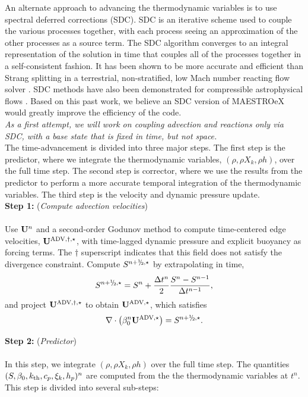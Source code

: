 \documentclass{aastex63}
\newcommand{\sfrac}[2]{\mathchoice
  {\kern0em\raise.5ex\hbox{\the\scriptfont0 #1}\kern-.15em/
   \kern-.15em\lower.25ex\hbox{\the\scriptfont0 #2}}
  {\kern0em\raise.5ex\hbox{\the\scriptfont0 #1}\kern-.15em/
   \kern-.15em\lower.25ex\hbox{\the\scriptfont0 #2}}
  {\kern0em\raise.5ex\hbox{\the\scriptscriptfont0 #1}\kern-.2em/
   \kern-.15em\lower.25ex\hbox{\the\scriptscriptfont0 #2}}
  {#1\!/#2}}
\newcommand{\myhalf}{\sfrac{1}{2}}
\newcommand{\Ub}{{\bf{U}}}
\newcommand{\uadvone}{\Ub^{\mathrm{ADV},\star}}
\newcommand{\uadvonedag}{\Ub^{\mathrm{ADV},\dagger,\star}}
\begin{document}
An alternate approach to advancing the thermodynamic variables is to use
spectral deferred corrections (SDC). SDC is an iterative scheme used to couple the various processes
together, with each process seeing an  approximation of the other processes as a source term.
The SDC algorithm converges to an integral representation of the solution in
time that couples all of the processes together in a self-consistent fashion.
It has been shown to be more accurate and efficient than Strang splitting in a
terrestrial, non-stratified, low Mach number reacting flow solver \cite{nonaka2012sdc}.
SDC methods have also been demonstrated for compressible astrophysical flows \cite{castro_sdc}.
Based on this past work, we believe an SDC version of MAESTROeX would greatly improve the efficiency of the code.
\\

\emph{As a first attempt, we will work on coupling advection and reactions only
via SDC, with a base state that is fixed in time, but not space.}
\\

The time-advancement is divided into three major steps.  The first step is the predictor, where we integrate the thermodynamic variables, $(\rho,\rho X_k,\rho h)$, over the full time step.  The second step is corrector, where we use the results from the predictor to perform a more accurate temporal integration of the thermodynamic variables.  The third step is the velocity and dynamic pressure update.\\

{\bf Step 1:} ({\it Compute advection velocities})\\ \\
Use $\Ub^n$ and a second-order Godunov method to compute time-centered edge velocities, $\uadvonedag$, with time-lagged dynamic pressure and explicit buoyancy as forcing terms.  The $\dagger$ superscript indicates that this field does not satisfy the divergence constraint.  Compute $S^{n+\myhalf,\star}$ by extrapolating in time,
\begin{equation}
S^{n+\myhalf,\star} = S^n + \frac{\Delta t^n}{2}\frac{S^n - S^{n-1}}{\Delta t^{n-1}},
\end{equation}
and project $\uadvonedag$ to obtain $\uadvone$, which satisfies
\begin{equation}
\nabla\cdot\left(\beta_0^n\uadvone\right) = S^{n+\myhalf,\star}.
\end{equation}

{\bf Step 2:} ({\it Predictor})\\ \\
 In this step, we integrate $(\rho, \rho X_k, \rho h)$ over the full time step.  The quantities $(S, \beta_0, k_{\rm th}, c_p, \xi_k, h_p)^n$ are computed from the the thermodynamic variables at $t^n$.  This step is divided into several sub-steps:\\
\end{document}
